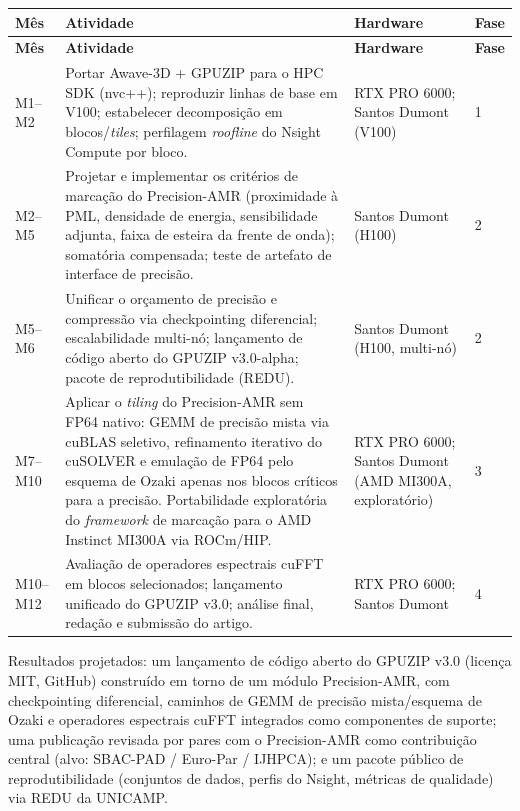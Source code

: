 \documentclass[12pt,a4paper]{article}
\begin{document}
\begin{longtable}{@{}p{}p{}p{}p{}@{}}
\toprule
\textbf{Mês} & \textbf{Atividade} & \textbf{Hardware} & \textbf{Fase}\\
\midrule
\endfirsthead
\toprule
\textbf{Mês} & \textbf{Atividade} & \textbf{Hardware} & \textbf{Fase}\\
\midrule
\endhead
\bottomrule
\endfoot
M1--M2 & Portar Awave-3D + GPUZIP para o HPC SDK (nvc++); reproduzir linhas de
base em V100; estabelecer decomposição em blocos/\emph{tiles}; perfilagem
\emph{roofline} do Nsight Compute por bloco. & RTX PRO 6000; Santos Dumont
(V100) & 1\\
\addlinespace
M2--M5 & Projetar e implementar os critérios de marcação do Precision-AMR
(proximidade à PML, densidade de energia, sensibilidade adjunta, faixa de
esteira da frente de onda); somatória compensada; teste de artefato de
interface de precisão. & Santos Dumont (H100) & 2\\
\addlinespace
M5--M6 & Unificar o orçamento de precisão e compressão via checkpointing
diferencial; escalabilidade multi-nó; lançamento de código aberto do GPUZIP
v3.0-alpha; pacote de reprodutibilidade (REDU). & Santos Dumont (H100,
multi-nó) & 2\\
\addlinespace
M7--M10 & Aplicar o \emph{tiling} do Precision-AMR sem FP64 nativo: GEMM de
precisão mista via cuBLAS seletivo, refinamento iterativo do cuSOLVER e
emulação de FP64 pelo esquema de Ozaki apenas nos blocos críticos para a
precisão. Portabilidade exploratória do \emph{framework} de marcação para o
AMD Instinct MI300A via ROCm/HIP. & RTX PRO 6000; Santos Dumont (AMD MI300A,
exploratório) & 3\\
\addlinespace
M10--M12 & Avaliação de operadores espectrais cuFFT em blocos selecionados;
lançamento unificado do GPUZIP v3.0; análise final, redação e submissão do
artigo. & RTX PRO 6000; Santos Dumont & 4\\
\end{longtable}

Resultados projetados: um lançamento de código aberto do GPUZIP v3.0
(licença MIT, GitHub) construído em torno de um módulo Precision-AMR, com
checkpointing diferencial, caminhos de GEMM de precisão mista/esquema de
Ozaki e operadores espectrais cuFFT integrados como componentes de suporte;
uma publicação revisada por pares com o Precision-AMR como contribuição
central (alvo: SBAC-PAD / Euro-Par / IJHPCA); e um pacote público de
reprodutibilidade (conjuntos de dados, perfis do Nsight, métricas de
qualidade) via REDU da UNICAMP.
\end{document}
